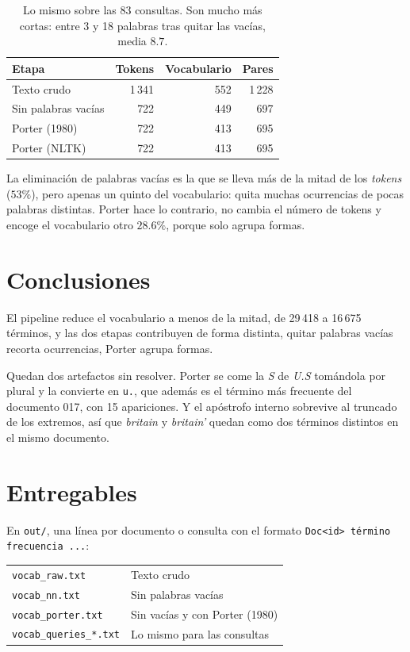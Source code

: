 \documentclass[11pt,letterpaper]{article}
\begin{document}
\begin{table}[H]
  \centering
  \begin{tabular}{lrrr}
    \toprule
    \textbf{Etapa} & \textbf{Tokens} & \textbf{Vocabulario} &
      \textbf{Pares} \\
    \midrule
    Texto crudo         & 1\,341 & 552 & 1\,228 \\
    Sin palabras vacías & 722        & 449 & 697 \\
    Porter (1980)       & 722        & 413 & 695 \\
    Porter (NLTK)       & 722        & 413 & 695 \\
    \bottomrule
  \end{tabular}
  \caption{Lo mismo sobre las 83 consultas. Son mucho más cortas:
    entre 3 y 18 palabras tras quitar las vacías, media $8.7$.}
  \label{tab:queries}
\end{table}


La eliminación de palabras vacías es la que se lleva más de la mitad
de los \emph{tokens} ($53\%$), pero apenas un quinto del
vocabulario: quita muchas ocurrencias de pocas palabras distintas.
Porter hace lo contrario, no cambia el número de tokens y encoge el
vocabulario otro $28.6\%$, porque solo agrupa formas.

\section{Conclusiones}

El pipeline reduce el vocabulario a menos de la mitad, de 29\,418
a 16\,675 términos, y las dos etapas contribuyen de forma
distinta, quitar palabras vacías recorta ocurrencias, Porter agrupa
formas.

Quedan dos artefactos sin resolver. Porter se come la \emph{S} de
\emph{U.S} tomándola por plural y la convierte en \texttt{u.}, que
además es el término más frecuente del documento 017, con
15 apariciones. Y el apóstrofo interno sobrevive al truncado de los
extremos, así que \emph{britain} y \emph{britain'} quedan como dos
términos distintos en el mismo documento.

\section*{Entregables}

En \texttt{out/}, una línea por documento o consulta con el formato
\texttt{Doc<id> término frecuencia ...}:

\begin{center}
\begin{tabular}{ll}
    \toprule
    \texttt{vocab\_raw.txt} & Texto crudo \\
    \texttt{vocab\_nn.txt} & Sin palabras vacías \\
    \texttt{vocab\_porter.txt} & Sin vacías y con Porter (1980) \\
    \texttt{vocab\_queries\_*.txt} & Lo mismo para las consultas \\
    \bottomrule
\end{tabular}
\end{center}
\end{document}
